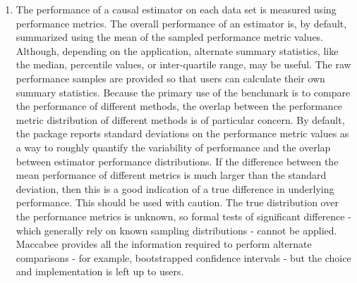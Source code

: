 \documentclass[./main.tex]{subfiles}
\begin{document}
\begin{enumerate}
    \item The performance of a causal estimator on each data set is measured using performance metrics. The overall performance of an estimator is, by default, summarized using the mean of the sampled performance metric values. Although, depending on the application, alternate summary statistics, like the median, percentile values, or inter-quartile range, may be useful. The raw performance samples are provided so that users can calculate their own summary statistics. Because the primary use of the benchmark is to compare the performance of different methods, the overlap between the performance metric distribution of different methods is of particular concern. By default, the package reports standard deviations on the performance metric values as a way to roughly quantify the variability of performance and the overlap between estimator performance distributions. If the difference between the mean performance of different metrics is much larger than the standard deviation, then this is a good indication of a true difference in underlying performance. This should be used with caution. The true distribution over the performance metrics is unknown, so formal tests of significant difference - which generally rely on known sampling distributions - cannot be applied. Maccabee provides all the information required to perform alternate comparisons - for example, bootstrapped confidence intervals - but the choice and implementation is left up to users.
    
    \vspace{\baselineskip}
    

\end{enumerate}
\end{document}

